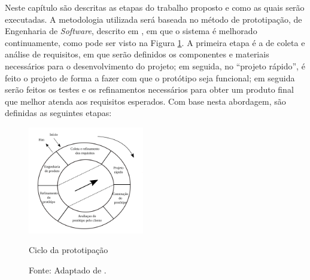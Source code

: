 
Neste capítulo são descritas as etapas do trabalho proposto e como as quais serão executadas. %
A metodologia utilizada será baseada no método de prototipação, de Engenharia de \textit{Software}, 
descrito em \cite{pressman}, em que o sistema é melhorado 
continuamente, como pode ser visto na Figura \ref{fig:prototipacao}. %
A primeira etapa é a de coleta e análise de requisitos, em que serão definidos os componentes e materiais necessários para o 
desenvolvimento do projeto; em seguida, no \textquotedblleft projeto rápido\textquotedblright, é feito o projeto de forma a 
fazer com que o protótipo seja funcional; em seguida serão feitos os testes e os refinamentos necessários para obter um produto final 
que melhor atenda aos requisitos esperados. 
Com base nesta abordagem, são definidas as seguintes etapas:

\begin{figure}[h]
 \centering
 \captionsetup{width=0.45\textwidth,font=footnotesize,textfont=bf}
 \includegraphics[width=0.45\textwidth,height=0.45\textheight,keepaspectratio]{figuras/prototipacao.png}
 \caption{Ciclo da prototipação \label{fig:prototipacao}}
 \vspace{-0.3cm}
 \caption*{Fonte: Adaptado de \cite[p.36]{pressman}.}
\end{figure}


